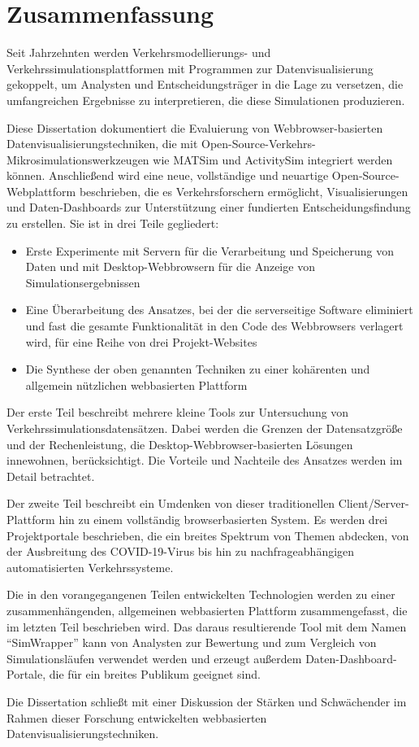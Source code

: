 \chapter*{Zusammenfassung}

Seit Jahrzehnten werden Verkehrsmodellierungs- und Verkehrssimulationsplattformen mit Programmen zur Datenvisualisierung gekoppelt, um Analysten und Entscheidungsträger in die Lage zu versetzen, die umfangreichen Ergebnisse zu interpretieren, die diese Simulationen produzieren.

Diese Dissertation dokumentiert die Evaluierung von Webbrowser-basierten Datenvisualisierungstechniken, die mit Open-Source-Verkehrs-Mikrosimulationswerkzeugen wie MATSim und ActivitySim integriert werden können. Anschließend wird eine neue, vollständige und neuartige Open-Source-Webplattform beschrieben, die es Verkehrsforschern ermöglicht, Visualisierungen und Daten-Dashboards zur Unterstützung einer fundierten Entscheidungsfindung zu erstellen. Sie ist in drei Teile gegliedert:

\begin{itemize}
  \item Erste Experimente mit Servern für die Verarbeitung und Speicherung von Daten und mit Desktop-Webbrowsern für die Anzeige von Simulationsergebnissen
  \item Eine Überarbeitung des Ansatzes, bei der die serverseitige Software eliminiert und fast die gesamte Funktionalität in den Code des Webbrowsers verlagert wird, für eine Reihe von drei Projekt-Websites
  \item Die Synthese der oben genannten Techniken zu einer kohärenten und allgemein nützlichen webbasierten Plattform
\end{itemize}

Der erste Teil beschreibt mehrere kleine Tools zur Untersuchung von Verkehrssimulationsdatensätzen. Dabei werden die Grenzen der Datensatzgröße und der Rechenleistung, die Desktop-Webbrowser-basierten Lösungen innewohnen, berücksichtigt. Die Vorteile und Nachteile des Ansatzes werden im Detail betrachtet.

Der zweite Teil beschreibt ein Umdenken von dieser traditionellen Client/Server-Plattform hin zu einem vollständig browserbasierten System. Es werden drei Projektportale beschrieben, die ein breites Spektrum von Themen abdecken, von der Ausbreitung des COVID-19-Virus bis hin zu nachfrageabhängigen automatisierten Verkehrssysteme.

Die in den vorangegangenen Teilen entwickelten Technologien werden zu einer zusammenhängenden, allgemeinen webbasierten Plattform zusammengefasst, die im letzten Teil beschrieben wird. Das daraus resultierende Tool mit dem Namen “SimWrapper” kann von Analysten zur Bewertung und zum Vergleich von Simulationsläufen verwendet werden und erzeugt außerdem Daten-Dashboard-Portale, die für ein breites Publikum geeignet sind.

Die Dissertation schließt mit einer Diskussion der Stärken und Schwächender im Rahmen dieser Forschung entwickelten webbasierten Datenvisualisierungstechniken.


